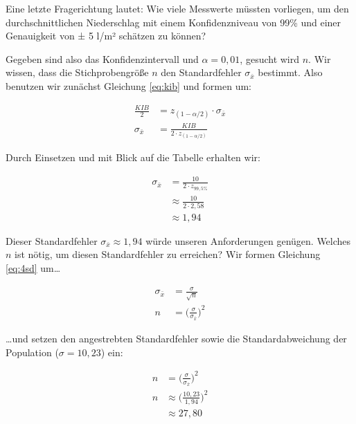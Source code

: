 \documentclass[
  11pt,
  ngerman,
  a4paper,
]{report}
\begin{document}
Eine letzte Fragerichtung lautet: Wie viele Messwerte müssten vorliegen, um den durchschnittlichen Niederschlag mit einem Konfidenzniveau von 99\% und einer Genauigkeit von ± 5 l/m² schätzen zu können?

Gegeben sind also das Konfidenzintervall und \(\alpha=0{,}01\), gesucht wird \(n\). Wir wissen, dass die Stichprobengröße \(n\) den Standardfehler \(\sigma_{\bar{x}}\) bestimmt. Also benutzen wir zunächst Gleichung \eqref{eq:kib} und formen um:

\nopagebreak

\[\begin{aligned}
\frac{\mathit{KIB}}{2} &= z_{(1-\alpha/2)} \cdot \sigma_{\bar{x}}\\[4pt]
\sigma_{\bar{x}} &= \frac{\mathit{KIB}}{2\cdot z_{(1-\alpha/2)}} 
\end{aligned}\]

Durch Einsetzen und mit Blick auf die Tabelle erhalten wir:

\nopagebreak

\[\begin{aligned}
\sigma_{\bar{x}} &= \frac{10}{2\cdot z_{99{,}5\%}}\\[4pt]
 &\approx \frac{10}{2\cdot 2{,}58}\\[4pt]
 &\approx 1{,}94
\end{aligned}\]

Dieser Standardfehler \(\sigma_{\bar{x}}\approx1{,}94\) würde unseren Anforderungen genügen. Welches \(n\) ist nötig, um diesen Standardfehler zu erreichen? Wir formen Gleichung \eqref{eq:4sd} um\ldots{}

\nopagebreak

\[\begin{aligned}
\sigma_{\bar{x}} &= \frac{\sigma}{\sqrt{n}}\\[4pt]
               n &= \Big(\frac{\sigma}{\sigma_{\bar{x}}}\Big)^2
\end{aligned}\]

\ldots und setzen den angestrebten Standardfehler sowie die Standardabweichung der Population (\(\sigma=10{,}23\)) ein:

\nopagebreak

\[
\begin{aligned}
n&=\Big(\frac{\sigma}{\sigma_{\bar{x}}}\Big)^2\\[4pt]
n&\approx\bigg(\frac{10{,}23}{1{,}94}\bigg)^2\\[4pt]
&\approx27{,}80
\end{aligned}
\]
\end{document}
